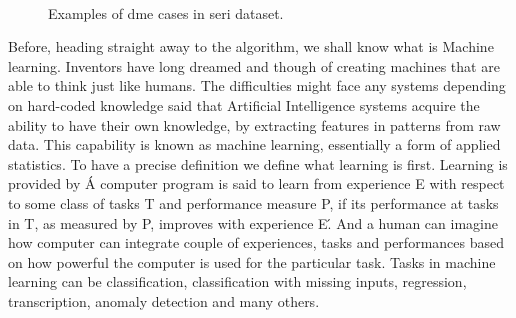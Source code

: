 \begin{figure}[t]
\begin{center}
    \
    \   
    \\
    
\end{center}
    \caption{Examples of \acs{dme} cases in \acs{seri} dataset.}
  \label{fig:bbdd}
\end{figure}

Before, heading straight away to the algorithm, we shall know what is Machine learning.
Inventors have long dreamed and though of creating machines that are able to think just like humans.
The difficulties might face any systems depending on hard-coded knowledge said that Artificial Intelligence systems acquire the ability to have their own knowledge, by extracting features in patterns from raw data.
This capability is known as machine learning, essentially a form of applied statistics.
To have a precise definition we define what learning is first.
Learning is provided by \cite{mitchell1998introduction} \' A computer program is said to learn from experience E with respect to some class of tasks T and performance measure P, if its performance at tasks in T, as measured by P, improves with experience E\' .
And a human can imagine how computer can integrate couple of experiences, tasks and performances based on how powerful the computer is used for the particular task.
Tasks in machine learning can be classification, classiﬁcation with missing inputs, regression, transcription, anomaly detection and many others. 

